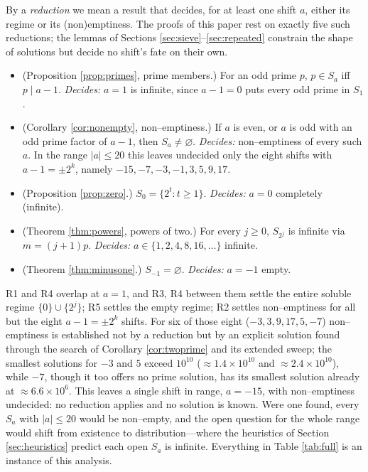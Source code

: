 \documentclass[11pt,reqno]{amsart}
\theoremstyle{plain}
\theoremstyle{definition}
\theoremstyle{remark}
\newcommand{\dvd}{\mid}
\newcommand{\Sa}{S_a}
\begin{document}
By a \emph{reduction} we mean a result that decides, for at least one shift $a$, either its regime or its (non)emptiness. The proofs of this paper rest on exactly five such reductions; the lemmas of Sections \ref{sec:sieve}--\ref{sec:repeated} constrain the shape of solutions but decide no shift's fate on their own.

\begin{itemize}
\item[\textbf{R1}] (Proposition \ref{prop:primes}, prime members.) For an odd prime $p$, $p\in\Sa$ iff $p\dvd a-1$. \emph{Decides:} $a=1$ is infinite, since $a-1=0$ puts every odd prime in $S_1$.
\item[\textbf{R2}] (Corollary \ref{cor:nonempty}, non--emptiness.) If $a$ is even, or $a$ is odd with an odd prime factor of $a-1$, then $\Sa\ne\varnothing$. \emph{Decides:} non--emptiness of every such $a$. In the range $|a|\le20$ this leaves undecided only the eight shifts with $a-1=\pm2^{k}$, namely $-15,-7,-3,-1,3,5,9,17$.
\item[\textbf{R3}] (Proposition \ref{prop:zero}.) $S_0=\{2^{t}:t\ge1\}$. \emph{Decides:} $a=0$ completely (infinite).
\item[\textbf{R4}] (Theorem \ref{thm:powers}, powers of two.) For every $j\ge0$, $S_{2^{j}}$ is infinite via $m=(j+1)p$. \emph{Decides:} $a\in\{1,2,4,8,16,\dots\}$ infinite.
\item[\textbf{R5}] (Theorem \ref{thm:minusone}.) $S_{-1}=\varnothing$. \emph{Decides:} $a=-1$ empty.
\end{itemize}

R1 and R4 overlap at $a=1$, and R3, R4 between them settle the entire soluble regime $\{0\}\cup\{2^{j}\}$; R5 settles the empty regime; R2 settles non--emptiness for all but the eight $a-1=\pm2^{k}$ shifts. For six of those eight ($-3,3,9,17,5,-7$) non--emptiness is established not by a reduction but by an explicit solution found through the search of Corollary \ref{cor:twoprime} and its extended sweep; the smallest solutions for $-3$ and $5$ exceed $10^{10}$ ($\approx1.4\times10^{10}$ and $\approx2.4\times10^{10}$), while $-7$, though it too offers no prime solution, has its smallest solution already at $\approx6.6\times10^{6}$. This leaves a single shift in range, $a=-15$, with non--emptiness undecided: no reduction applies and no solution is known. Were one found, every $S_a$ with $|a|\le20$ would be non--empty, and the open question for the whole range would shift from existence to distribution---where the heuristics of Section \ref{sec:heuristics} predict each open $S_a$ is infinite. Everything in Table \ref{tab:full} is an instance of this analysis.
\end{document}
